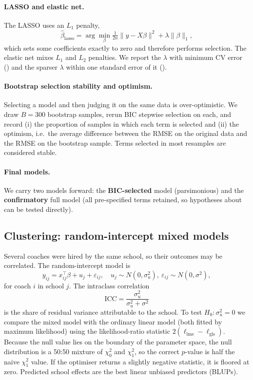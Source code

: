 \documentclass[9pt,a4paper]{article}
\newcommand{\var}[1]{\texttt{\detokenize{#1}}}
\begin{document}
\paragraph{LASSO and elastic net.} The LASSO uses an $L_1$ penalty,
\[
\hat\beta_{\text{lasso}}=\arg\min_\beta \tfrac{1}{2n}\|y-X\beta\|^2+\lambda\|\beta\|_1,
\]
which sets some coefficients exactly to zero and therefore performs selection. The elastic net mixes $L_1$ and $L_2$ penalties. We report the $\lambda$ with minimum CV error (\var{lambda.min}) and the sparser $\lambda$ within one standard error of it (\var{lambda.1se}).

\paragraph{Bootstrap selection stability and optimism.} Selecting a model and then judging it on the same data is over-optimistic. We draw $B=300$ bootstrap samples, rerun BIC stepwise selection on each, and record (i) the proportion of samples in which each term is selected and (ii) the optimism, i.e.\ the average difference between the RMSE on the original data and the RMSE on the bootstrap sample. Terms selected in most resamples are considered stable.

\paragraph{Final models.} We carry two models forward: the \textbf{BIC-selected} model (parsimonious) and the \textbf{confirmatory} full model (all pre-specified terms retained, so hypotheses about \var{AllPriorWinPct} can be tested directly).

\subsection{Clustering: random-intercept mixed models}
Several coaches were hired by the same school, so their outcomes may be correlated. The random-intercept model is
\[
y_{ij}=x_{ij}^\top\beta+u_j+\varepsilon_{ij},\quad u_j\sim N(0,\sigma_u^2),\ \varepsilon_{ij}\sim N(0,\sigma^2),
\]
for coach $i$ in school $j$. The intraclass correlation
\[
\mathrm{ICC}=\frac{\sigma_u^2}{\sigma_u^2+\sigma^2}
\]
is the share of residual variance attributable to the school. To test $H_0:\sigma_u^2=0$ we compare the mixed model with the ordinary linear model (both fitted by maximum likelihood) using the likelihood-ratio statistic $2(\ell_{\text{lme}}-\ell_{\text{gls}})$. Because the null value lies on the boundary of the parameter space, the null distribution is a 50:50 mixture of $\chi^2_0$ and $\chi^2_1$, so the correct $p$-value is half the naive $\chi^2_1$ value. If the optimiser returns a slightly negative statistic, it is floored at zero. Predicted school effects are the best linear unbiased predictors (BLUPs).
\end{document}
